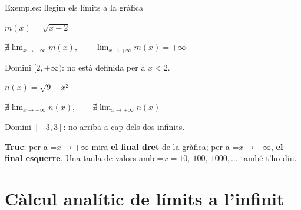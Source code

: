 \documentclass[11pt,a4paper]{article}
\newcommand{\fmm}[1]{\setbox0=\hbox{$#1$}\ifdim\wd0>\linewidth\[#1\]\else\mbox{\box0}\fi}
\newcommand{\fmuline}[1]{\textbf{\color{fmaccent}#1}}
\begin{document}
\begin{fmexfill}{Exemples: llegim els límits a la gràfica}
\begin{minipage}[t][\tcbtextheight][s]{\linewidth}
\noindent \begin{minipage}[t]{0.48\linewidth}\centering $m(x)=\sqrt{x-2}$\par\smallskip {}\par\smallskip $\displaystyle\nexists\lim_{x\to-\infty}m(x),\qquad\lim_{x\to+\infty}m(x)=+\infty$\par Domini $[2,+\infty)$: no està definida per a $x<2$.\end{minipage}\hfill\begin{minipage}[t]{0.48\linewidth}\centering $n(x)=\sqrt{9-x^2}$\par\smallskip {}\par\smallskip $\displaystyle\nexists\lim_{x\to-\infty}n(x),\qquad\nexists\lim_{x\to+\infty}n(x)$\par Domini $[-3,3]$: no arriba a cap dels dos infinits.\end{minipage}\par
\vfill

      
\begin{fmnote}\fmuline{Truc}: per a \fmm{x\to+\infty} mira \textbf{el final dret} de la gràfica; per a \fmm{x\to-\infty}, \textbf{el final esquerre}. Una taula de valors amb \fmm{x=10,\ 100,\ 1000,\dots} també t'ho diu.\end{fmnote}
\end{minipage}
\end{fmexfill}

  
\section{Càlcul analític de límits a l'infinit}\hypertarget{sec2}{}

  
\end{document}
